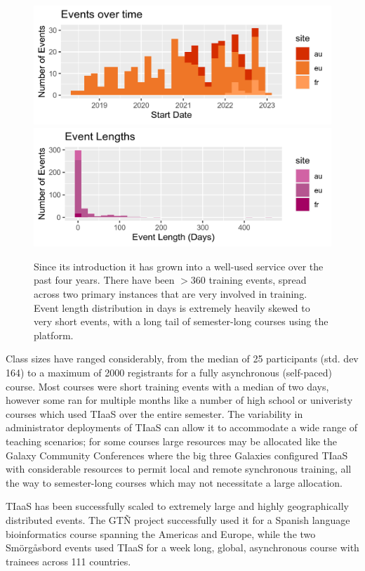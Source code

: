 \documentclass[a4paper,num-refs]{oup-contemporary}
\begin{document}
\begin{figure}[bt!]
\centering
	\includegraphics[width=\linewidth]{event-starts.png}
	\includegraphics[width=\linewidth]{event-lengths.png}
	\caption{Since its introduction it has grown into a well-used service over the past four years. There have been $>360$ training events, spread across two primary instances that are very involved in training. Event length distribution in days is extremely heavily skewed to very short events, with a long tail of semester-long courses using the platform.}\label{figure:graphs}
\end{figure}

Class sizes have ranged considerably, from the median of 25 participants (std. dev 164) to a maximum of 2000 registrants for a fully asynchronous (self-paced) course. Most courses were short training events with a median of two days, however some ran for multiple months like a number of high school or univeristy courses which used TIaaS over the entire semester. The variability in administrator deployments of TIaaS can allow it to accommodate a wide range of teaching scenarios; for some courses large resources may be allocated like the Galaxy Community Conferences where the big three Galaxies configured TIaaS with considerable resources to permit local and remote synchronous training, all the way to semester-long courses which may not necessitate a large allocation.

TIaaS has been successfully scaled to extremely large and highly geographically distributed events. The GT\~{N} project successfully used it for a Spanish language bioinformatics course spanning the Americas and Europe, while the two Sm\"{o}rg\r{a}sbord events used TIaaS for a week long, global, asynchronous course with trainees across 111 countries.
\end{document}
